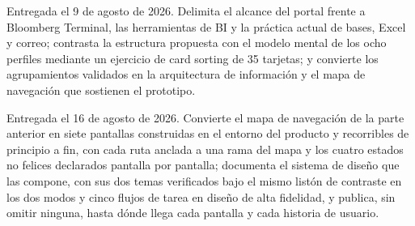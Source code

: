 \documentclass[11pt,letterpaper]{article}
\begin{document}






  {Entregada el 9 de agosto de 2026. Delimita el alcance del portal frente a Bloomberg
   Terminal, las herramientas de BI y la práctica actual de bases, Excel y correo; contrasta
   la estructura propuesta con el modelo mental de los ocho perfiles mediante un ejercicio de
   card sorting de 35 tarjetas; y convierte los agrupamientos validados en la arquitectura de
   información y el mapa de navegación que sostienen el prototipo.}


\label{cmp:competitivo}


\label{cmp:arquitectura}

\label{cmp:mapanav}




  {Entregada el 16 de agosto de 2026. Convierte el mapa de navegación de la parte anterior en siete
   pantallas construidas en el entorno del producto y recorribles de principio a fin, con cada ruta
   anclada a una rama del mapa y los cuatro estados no felices declarados pantalla por pantalla;
   documenta el sistema de diseño que las compone, con sus dos temas verificados bajo el mismo
   listón de contraste en los dos modos y cinco flujos de tarea en diseño de alta fidelidad, y
   publica, sin omitir ninguna, hasta dónde llega cada pantalla y cada historia de usuario.}



\label{cmp:prototipos}

\clearpage
{}\label{cmp:guia}





\end{document}
